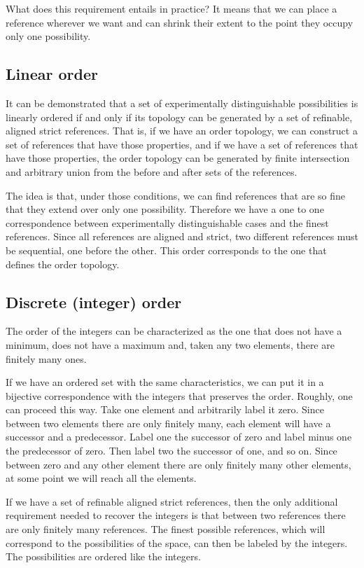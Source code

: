 \documentclass[12pt]{iopart}
\begin{document}
What does this requirement entails in practice? It means that we can place a reference wherever we want and can shrink their extent to the point they occupy only one possibility.

\subsection{Linear order}

It can be demonstrated that a set of experimentally distinguishable possibilities is linearly ordered if and only if its topology can be generated by a set of refinable, aligned strict references. That is, if we have an order topology, we can construct a set of references that have those properties, and if we have a set of references that have those properties, the order topology can be generated by finite intersection and arbitrary union from the before and after sets of the references.

The idea is that, under those conditions, we can find references that are so fine that they extend over only one possibility. Therefore we have a one to one correspondence between experimentally distinguishable cases and the finest references. Since all references are aligned and strict, two different references must be sequential, one before the other. This order corresponds to the one that defines the order topology.

\subsection{Discrete (integer) order}

The order of the integers can be characterized as the one that does not have a minimum, does not have a maximum and, taken any two elements, there are finitely many ones.

If we have an ordered set with the same characteristics, we can put it in a bijective correspondence with the integers that preserves the order. Roughly, one can proceed this way. Take one element and arbitrarily label it zero. Since between two elements there are only finitely many, each element will have a successor and a predecessor. Label one the successor of zero and label minus one the predecessor of zero. Then label two the successor of one, and so on. Since between zero and any other element there are only finitely many other elements, at some point we will reach all the elements.

If we have a set of refinable aligned strict references, then the only additional requirement needed to recover the integers is that between two references there are only finitely many references. The finest possible references, which will correspond to the possibilities of the space, can then be labeled by the integers. The possibilities are ordered like the integers.
\end{document}
